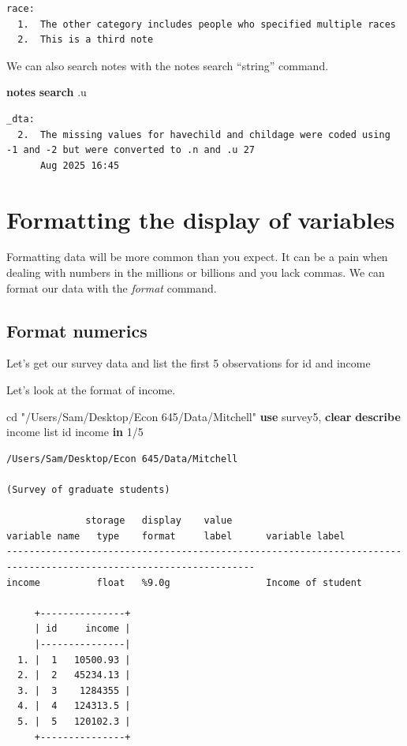 \documentclass[
]{book}
\newenvironment{Shaded}{\begin{snugshade}}{\end{snugshade}}
\newcommand{\KeywordTok}[1]{\textcolor[rgb]{0.13,0.29,0.53}{\textbf{#1}}}
\newcommand{\NormalTok}[1]{#1}
\newcommand{\OtherTok}[1]{\textcolor[rgb]{0.56,0.35,0.01}{#1}}
\newcommand{\StringTok}[1]{\textcolor[rgb]{0.31,0.60,0.02}{#1}}
\begin{document}
\begin{verbatim}
race:
  1.  The other category includes people who specified multiple races
  2.  This is a third note
\end{verbatim}

We can also search notes with the notes search ``string'' command.

\begin{Shaded}
\begin{Highlighting}[]
\KeywordTok{notes} \KeywordTok{search}\NormalTok{ .u}
\end{Highlighting}
\end{Shaded}

\begin{verbatim}
_dta:
  2.  The missing values for havechild and childage were coded using -1 and -2 but were converted to .n and .u 27
      Aug 2025 16:45
\end{verbatim}

\section{Formatting the display of variables}\label{formatting-the-display-of-variables}

Formatting data will be more common than you expect. It can be a pain when dealing with numbers in the millions or billions and you lack commas. We can format our data with the \emph{format} command.

\subsection{Format numerics}\label{format-numerics}

Let's get our survey data and list the first 5 observations for id and income

Let's look at the format of income.

\begin{Shaded}
\begin{Highlighting}[]
\NormalTok{cd }\StringTok{"/Users/Sam/Desktop/Econ 645/Data/Mitchell"}
\KeywordTok{use}\NormalTok{ survey5, }\KeywordTok{clear}
\KeywordTok{describe}\NormalTok{ income}
\OtherTok{list}\NormalTok{ id income }\KeywordTok{in}\NormalTok{ 1/5}
\end{Highlighting}
\end{Shaded}

\begin{verbatim}
/Users/Sam/Desktop/Econ 645/Data/Mitchell

(Survey of graduate students)

              storage   display    value
variable name   type    format     label      variable label
------------------------------------------------------------------------------------------------------------------
income          float   %9.0g                 Income of student

     +---------------+
     | id     income |
     |---------------|
  1. |  1   10500.93 |
  2. |  2   45234.13 |
  3. |  3    1284355 |
  4. |  4   124313.5 |
  5. |  5   120102.3 |
     +---------------+
\end{verbatim}
\end{document}
